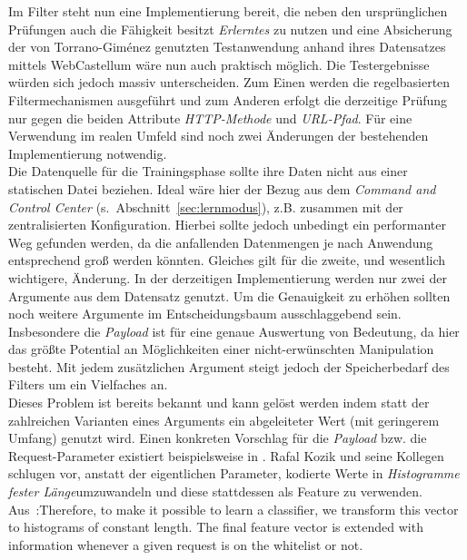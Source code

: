 Im Filter steht nun eine Implementierung bereit, die neben den ursprünglichen Prüfungen auch die Fähigkeit besitzt \emph{Erlerntes} zu nutzen und eine Absicherung der von Torrano-Giménez genutzten Testanwendung anhand ihres Datensatzes mittels WebCastellum wäre nun auch praktisch möglich. Die Testergebnisse würden sich jedoch massiv unterscheiden. Zum Einen werden die regelbasierten Filtermechanismen ausgeführt und zum Anderen erfolgt die derzeitige Prüfung nur gegen die beiden Attribute \emph{HTTP-Methode} und \emph{URL-Pfad}. Für eine Verwendung im realen Umfeld sind noch zwei Änderungen der bestehenden Implementierung notwendig.\\
Die Datenquelle für die Trainingsphase sollte ihre Daten nicht aus einer statischen Datei beziehen. Ideal wäre hier der Bezug aus dem \emph{Command and Control Center} (s.~Abschnitt~\ref{sec:lernmodus}), z.B. zusammen mit der zentralisierten Konfiguration. Hierbei sollte jedoch unbedingt ein performanter Weg gefunden werden, da die anfallenden Datenmengen je nach Anwendung entsprechend groß werden könnten. Gleiches gilt für die zweite, und wesentlich wichtigere, Änderung. In der derzeitigen Implementierung werden nur zwei der Argumente aus dem Datensatz genutzt. Um die Genauigkeit zu erhöhen sollten noch weitere Argumente im Entscheidungsbaum ausschlaggebend sein. Insbesondere die \emph{Payload} ist für eine genaue Auswertung von Bedeutung, da hier das größte Potential an Möglichkeiten einer nicht-erwünschten Manipulation besteht. Mit jedem zusätzlichen Argument steigt jedoch der Speicherbedarf des Filters um ein Vielfaches an.\\
Dieses Problem ist bereits bekannt und kann gelöst werden indem statt der zahlreichen Varianten eines Arguments ein abgeleiteter Wert (mit geringerem Umfang) genutzt wird. Einen konkreten Vorschlag für die \emph{Payload} bzw. die Request-Parameter existiert beispielsweise in \cite{kozik2014}. Rafal Kozik und seine Kollegen schlugen vor, anstatt der eigentlichen Parameter, kodierte Werte in \glqq\emph{Histogramme fester Länge}\grqq umzuwandeln und diese stattdessen als Feature zu verwenden.\\

\textcolor{bhtGray}{ Aus~\cite{kozik2014}:}Therefore, to make it possible to learn a classifier, we transform this vector to histograms of constant length. The final feature vector is extended with information whenever a given request is on the whitelist or not.\\

